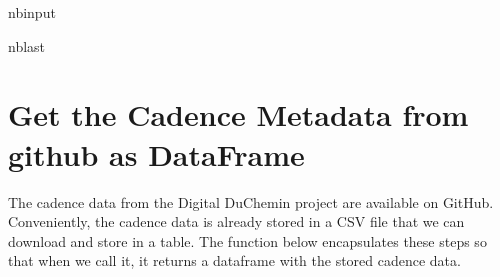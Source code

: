 \documentclass[letterpaper,10pt,english]{sphinxmanual}
\begin{document}
\begin{sphinxuseclass}{nbinput}
\begin{sphinxuseclass}{nblast}
{
\begin{sphinxVerbatim}[commandchars=\\\{\}]
\llap{\color{nbsphinxin}[19]:\,\hspace{\fboxrule}\hspace{\fboxsep}}    
    
  
   
    
  
\end{sphinxVerbatim}
}

\end{sphinxuseclass}
\end{sphinxuseclass}

\section{Get the Cadence Metadata from github as DataFrame}
\label{\detokenize{exercises/02_exercise:Get-the-Cadence-Metadata-from-github-as-DataFrame}}
\sphinxAtStartPar
The cadence data from the Digital DuChemin project are available on GitHub. Conveniently, the cadence data is already stored in a CSV file that we can download and store in a table. The function below encapsulates these steps so that when we call it, it returns a dataframe with the stored cadence data.
\end{document}
